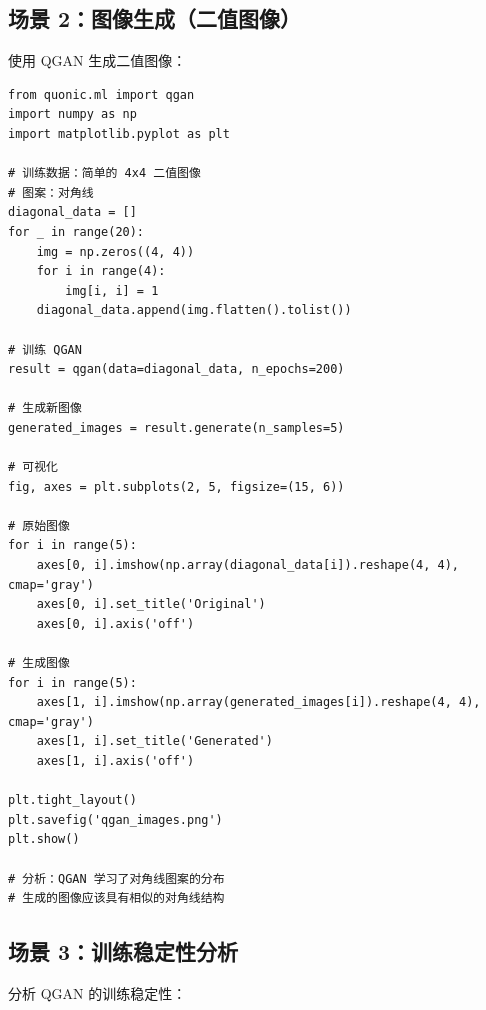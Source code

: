 \documentclass[12pt,a4paper]{article}
\begin{document}
\subsection{场景 2：图像生成（二值图像）}

使用 QGAN 生成二值图像：

\begin{verbatim}
from quonic.ml import qgan
import numpy as np
import matplotlib.pyplot as plt

# 训练数据：简单的 4x4 二值图像
# 图案：对角线
diagonal_data = []
for _ in range(20):
    img = np.zeros((4, 4))
    for i in range(4):
        img[i, i] = 1
    diagonal_data.append(img.flatten().tolist())

# 训练 QGAN
result = qgan(data=diagonal_data, n_epochs=200)

# 生成新图像
generated_images = result.generate(n_samples=5)

# 可视化
fig, axes = plt.subplots(2, 5, figsize=(15, 6))

# 原始图像
for i in range(5):
    axes[0, i].imshow(np.array(diagonal_data[i]).reshape(4, 4), cmap='gray')
    axes[0, i].set_title('Original')
    axes[0, i].axis('off')

# 生成图像
for i in range(5):
    axes[1, i].imshow(np.array(generated_images[i]).reshape(4, 4), cmap='gray')
    axes[1, i].set_title('Generated')
    axes[1, i].axis('off')

plt.tight_layout()
plt.savefig('qgan_images.png')
plt.show()

# 分析：QGAN 学习了对角线图案的分布
# 生成的图像应该具有相似的对角线结构
\end{verbatim}

\subsection{场景 3：训练稳定性分析}

分析 QGAN 的训练稳定性：
\end{document}
